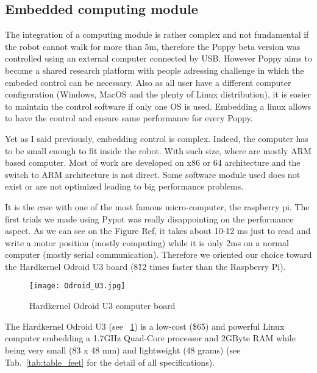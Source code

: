 \subsection{Embedded computing module} %

The integration of a computing module is rather complex and not fundamental if the robot cannot walk for more than 5m, therefore the Poppy beta version was controlled using an external computer connected by USB.
However Poppy aims to become a shared research platform with people adressing challenge in which the embeded control can be necessary. Also as all user have a different computer configuration (Windows, MacOS and the plenty of Linux distribution), it is easier to maintain the control software if only one OS is used. Embedding a linux allows to have the control and ensure same performance for every Poppy.

Yet as I said previously, embedding control is complex. Indeed, the computer has to be small enough to fit inside the robot. With such size, where are mostly ARM based computer. Most of work are developed on x86 or 64 architecture and the switch to ARM architecture is not direct. Some software module used does not exist or are not optimized leading to big performance problems.

It is the case with one of the most famous micro-computer, the raspberry pi. The first trials we made using Pypot was really disappointing on the performance aspect. As we can see on the Figure Ref, it takes about 10-12 ms just to read and write a motor position (mostly computing) while it is only 2ms on a normal computer (mostly serial communication). Therefore we oriented our choice toward the Hardkernel Odroid U3 board (8\~12 times faster than the Raspberry Pi).

\begin{figure}[!h]
    \begin{center}
        \texttt{[image: Odroid\_U3.jpg]}
    \end{center}
    \caption{Hardkernel Odroid U3 computer board}
    \label{fig:odroid_U3}
\end{figure}

The Hardkernel Odroid U3 (see \figurename~\ref{fig:odroid_U3}) is a low-cost (\$65) and powerful Linux computer embedding a 1.7GHz Quad-Core processor and 2GByte RAM while being very small (83 x 48 mm) and lightweight (48 grams) (see Tab.~\ref{tab:table_feet} for the detail of all specifications).

